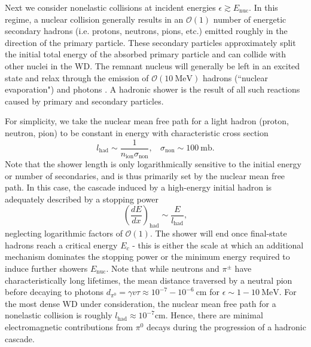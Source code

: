 \documentclass[twocolumn,showpacs,preprintnumbers,amsmath,amssymb,prd]{revtex4}
\newcommand{\OO}{\mathcal{O}}
\def\r{\right)}
\def\l{\left(}
\begin{document}
\begin{appendices}
Next we consider nonelastic collisions at incident energies $\epsilon \gtrsim E_\text{nuc}$. In this regime, a nuclear collision generally results in an $\OO(1)$ number of energetic secondary hadrons (i.e. protons, neutrons, pions, etc.) emitted roughly in the direction of the primary particle. These secondary particles approximately split the initial total energy of the absorbed primary particle and can collide with other nuclei in the WD. The remnant nucleus will generally be left in an excited state and relax through the emission of $\OO(10 ~\text{MeV})$ hadrons (``nuclear evaporation") and photons \cite{Rossi}. A hadronic shower is the result of all such reactions caused by primary and secondary particles.

For simplicity, we take the nuclear mean free path for a light hadron (proton, neutron, pion) to be constant in energy with characteristic cross section
\begin{equation}
l_\text{had} \sim  \frac{1}{n_\text{ion} \sigma_\text{non}}, ~~~~ \sigma_\text{non} \sim 100 ~\text{mb}.
\end{equation}
Note that the shower length is only logarithmically sensitive to the initial energy or number of secondaries, and is thus primarily set by the nuclear mean free path. In this case, the cascade induced by a high-energy initial hadron is adequately described by a stopping power
\begin{equation}
\label{eq:nucshower}
\l \frac{dE}{dx}\r_\text{had} \sim \frac{E}{l_\text{had}},
\end{equation}
neglecting logarithmic factors of $\OO(1)$. The shower will end once final-state hadrons reach a critical energy $E_c$ - this is either the scale at which an additional mechanism dominates the stopping power or the minimum energy required to induce further showers $E_\text{nuc}$. Note that while neutrons and $\pi^\pm$ have characteristically long lifetimes, the mean distance traversed by a neutral pion before decaying to photons $d_{\pi^0} = \gamma v \tau \approx 10^{-7} - 10^{-6} ~\text{cm}$ for $\epsilon \sim 1 - 10 ~\text{MeV}$. For the most dense WD under consideration, the nuclear mean free path for a nonelastic collision is roughly $l_\text{had} \approx 10^{-7} \text{cm}$. Hence, there are minimal electromagnetic contributions from $\pi^0$ decays during the progression of a hadronic cascade.


\end{appendices}
\end{document}
